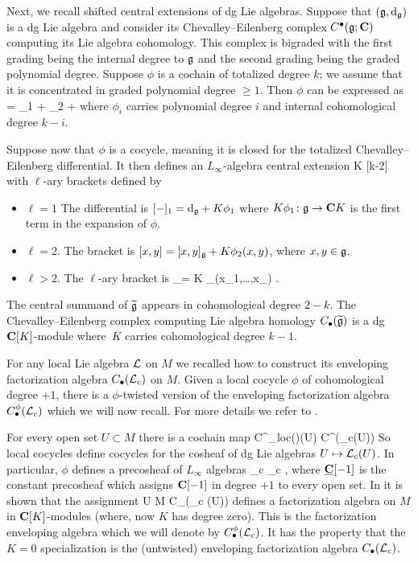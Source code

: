 \documentclass[11pt]{amsart}
\begin{document}
Next, we recall shifted central extensions of dg Lie algebras.
Suppose that $(\mathfrak{g},{\rm d}_{\mathfrak{g}})$ is a dg Lie algebra and consider its Chevalley--Eilenberg complex $C^\bullet(\mathfrak{g};\mathbf{C})$ computing its Lie algebra cohomology.
This complex is bigraded with the first grading being the internal degree to $\mathfrak{g}$ and the second grading being the graded polynomial degree.
Suppose $\phi$ is a cochain of totalized degree $k$; we assume that it is concentrated in graded polynomial degree $\geq 1$.
Then $\phi$ can be expressed as
\beqn
\phi = \phi_1 + \phi_2 + \cdots 
\eeqn
where $\phi_i$ carries polynomial degree $i$ and internal cohomological degree $k-i$.

Suppose now that $\phi$ is a cocycle, meaning it is closed for the totalized Chevalley--Eilenberg differential.
It then defines an $L_\infty$-algebra central extension
 \to \C K [k-2] \to  {} \to {} 
\eeqn
with $\ell$-ary brackets defined by
\begin{itemize}
\item $\ell = 1$
The differential is $[-]_1 = {\rm d}_{\mathfrak{g}} + K \phi_1$ where $K \phi_1 \colon \mathfrak{g} \to \mathbf{C} K$ is the first term in the expansion of $\phi$.
\item $\ell=2$. 
The bracket is $[x,y] = [x,y]_{\mathfrak{g}} + K \phi_2(x,y)$, where $x,y \in \mathfrak{g}$.
\item $\ell > 2$.
The $\ell$-ary bracket is
_\ell = K \phi_\ell(x_1,\ldots,x_\ell) .
\eeqn
\end{itemize}
The central summand of $\widetilde{\mathfrak{g}}$ appears in cohomological degree $2-k$. 
The Chevalley--Eilenberg complex computing Lie algebra homology $C_\bullet(\widetilde{\mathfrak{g}})$ is a dg $\mathbf{C}[K]$-module where~$K$ carries cohomological degree $k-1$.


For any local Lie algebra $\mathcal L$ on $M$ we recalled how to construct its enveloping factorization algebra $C_\bullet(\mathcal L_c)$ on $M$.
Given a local cocycle $\phi$ of cohomological degree $+1$, there is a $\phi$-twisted version of the enveloping factorization algebra $C_\bullet^\phi(\mathcal L_c)$ which we will now recall. 
For more details we refer to \cite[\S 11]{CG2}.

For every open set $U \subset M$ there is a cochain map
\beqn
C^\bu_{loc}(\cL)(U) \to C^\bu(\cL_c(U))
\eeqn
So local cocycles define cocycles for the cosheaf of dg Lie algebras $U \mapsto \mathcal L_c(U)$.
In particular, $\phi$ defines a precosheaf of $L_\infty$ algebras
 \to \ul \C[-1] \to \til \cL_c \to \cL_c  ,
\eeqn
where $\smash{\underline{\mathbf{C}}}[-1]$ is the constant precosheaf which assigns $\mathbf{C}[-1]$ in degree $+1$ to every open set.
In \cite{CG2} it is shown that the assignment
\beqn
U \subset M \mapsto C_\bu(\til \cL_c (U)) 
\eeqn
defines a factorization algebra on $M$ in $\mathbf{C}[K]$-modules (where, now $K$ has degree zero).
This is the  factorization enveloping algebra which we will denote by $C^\phi_\bullet(\mathcal L_c)$.
It has the property that the $K=0$ specialization is the (untwisted) enveloping factorization algebra $C_\bullet(\mathcal L_c)$.
\end{document}
